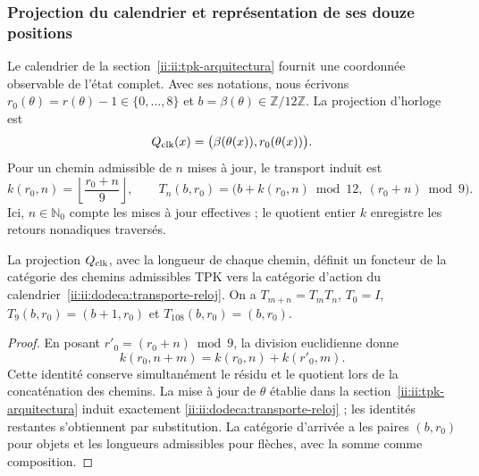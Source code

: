 \subsubsection{Projection du calendrier et représentation de ses douze positions}
\label{ii:ii:dodeca:calendario}
Le calendrier de la section~\ref{ii:ii:tpk-arquitectura} fournit une
coordonnée observable de l’état complet. Avec ses notations, nous écrivons
\(r_0(\theta)=r(\theta)-1\in\{0,\ldots,8\}\) et
\(b=\beta(\theta)\in\mathbb Z/12\mathbb Z\). La projection d’horloge est
\[
 Q_{\rm clk}(x)=\bigl(\beta(\theta(x)),r_0(\theta(x))\bigr).
\]
Pour un chemin admissible de \(n\) mises à jour, le transport induit est
\begin{equation}
 k(r_0,n)=\left\lfloor\frac{r_0+n}{9}\right\rfloor,
 \qquad
 T_n(b,r_0)=\bigl(b+k(r_0,n)\bmod12,\ (r_0+n)\bmod9\bigr).
 \label{ii:ii:dodeca:transporte-reloj}
\end{equation}
Ici, \(n\in\mathbb N_0\) compte les mises à jour effectives ; le quotient
entier \(k\) enregistre les retours nonadiques traversés.

\begin{proposition}
\label{ii:ii:dodeca:composicion}
La projection \(Q_{\rm clk}\), avec la longueur de chaque chemin, définit
un foncteur de la catégorie des chemins admissibles TPK vers la catégorie d’action
du calendrier~\eqref{ii:ii:dodeca:transporte-reloj}. On a
\(T_{m+n}=T_mT_n\), \(T_0=I\),
\(T_9(b,r_0)=(b+1,r_0)\) et \(T_{108}(b,r_0)=(b,r_0)\).
\end{proposition}
\begin{proof}
En posant \(r'_0=(r_0+n)\bmod9\), la division euclidienne donne
\[
 k(r_0,n+m)=k(r_0,n)+k(r'_0,m).
\]
Cette identité conserve simultanément le résidu et le quotient lors de la concaténation
des chemins. La mise à jour de \(\theta\) établie dans la
section~\ref{ii:ii:tpk-arquitectura} induit exactement
\eqref{ii:ii:dodeca:transporte-reloj} ; les identités restantes s’obtiennent
par substitution. La catégorie d’arrivée a les paires \((b,r_0)\) pour
objets et les longueurs admissibles pour flèches, avec la somme comme composition.
\end{proof}

